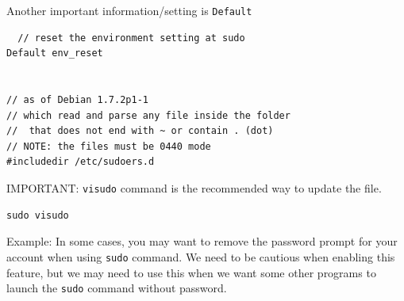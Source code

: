 Another important information/setting is \verb!Default!

\begin{verbatim}
  // reset the environment setting at sudo
Default env_reset   


// as of Debian 1.7.2p1-1
// which read and parse any file inside the folder
//  that does not end with ~ or contain . (dot)
// NOTE: the files must be 0440 mode
#includedir /etc/sudoers.d
\end{verbatim}

IMPORTANT: \verb!visudo! command is the recommended way to update the file.
\begin{verbatim}
sudo visudo
\end{verbatim}
\label{sec:visudo}


Example: In some cases, you may want to remove the password prompt for your
account when using \verb!sudo! command. We need to be cautious when enabling
this feature, but we may need to use this when we want some other programs to
launch the \verb!sudo! command without password.

